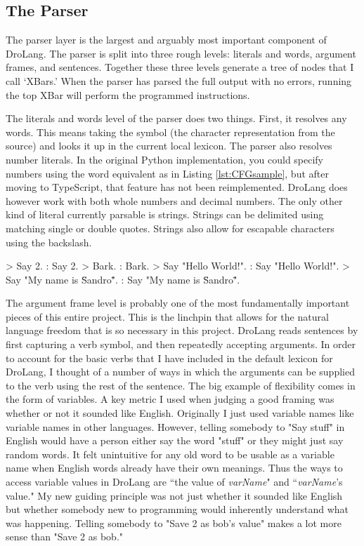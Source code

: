 \documentclass[titlepage]{article}
\newcommand{\lstRef}[1]{Listing \ref{lst:#1}}
\newcommand{\langName}{DroLang}
\begin{document}
\subsection*{The Parser}
The parser layer is the largest and arguably most important component of \langName{}. The parser is split into three rough levels: literals and words, argument frames, and sentences. Together these three levels generate a tree of nodes that I call `XBars.' When the parser has parsed the full output with no errors, running the top XBar will perform the programmed instructions.

The literals and words level of the parser does two things. First, it resolves any words. This means taking the symbol (the character representation from the source) and looks it up in the current local lexicon. The parser also resolves number literals. In the original Python implementation, you could specify numbers using the word equivalent as in \lstRef{CFGsample}, but after moving to TypeScript, that feature has not been reimplemented. \langName{} does however work with both whole numbers and decimal numbers. The only other kind of literal currently parsable is strings. Strings can be delimited using matching single or double quotes. Strings also allow for escapable characters using the backslash.

\begin{codeblock}[caption={Lexer and Literal Parsing},label={lst:literalExample}]
> Say 2.
: {Say}{ }{2}{.}
> Bark.
: {Bark}{.}
> Say "Hello World!".
: {Say}{ }{"Hello World!"}{.}
> Say "My name is \"Sandro\"".
: {Say}{ }{"My name is \"Sandro\""}{.}
\end{codeblock}

The argument frame level is probably one of the most fundamentally important pieces of this entire project. This is the linchpin that allows for the natural language freedom that is so necessary in this project. \langName{} reads sentences by first capturing a verb symbol, and then repeatedly accepting arguments. In order to account for the basic verbs that I have included in the default lexicon for \langName{}, I thought of a number of ways in which the arguments can be supplied to the verb using the rest of the sentence. The big example of flexibility comes in the form of variables. A key metric I used when judging a good framing was whether or not it sounded like English. Originally I just used variable names like variable names in other languages. However, telling somebody to "Say stuff" in English would have a person either say the word "stuff" or they might just say random words. It felt unintuitive for any old word to be usable as a variable name when English words already have their own meanings. Thus the ways to access variable values in \langName{} are ``the value of \textlangle\textit{varName}\textrangle" and ``\textlangle\textit{varName}\textrangle's value." My new guiding principle was not just whether it sounded like English but whether somebody new to programming would inherently understand what was happening. Telling somebody to "Save 2 as bob's value" makes a lot more sense than "Save 2 as bob."
\end{document}
